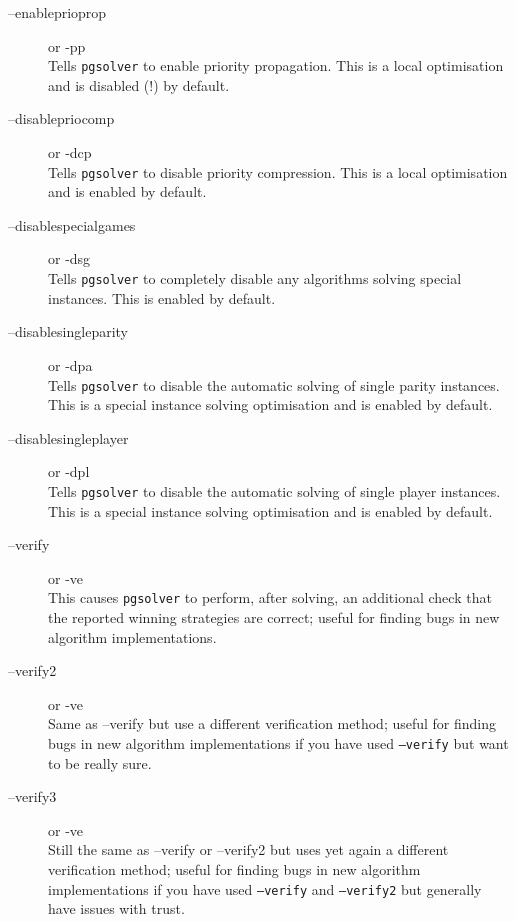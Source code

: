 \begin{description}
\item[{\ttfamily --enableprioprop}]  \enspace or {\ttfamily -pp} \\
   Tells \texttt{pgsolver} to enable priority propagation. This is a local optimisation and is disabled (!) by default.

\item[{\ttfamily --disablepriocomp}]  \enspace or {\ttfamily -dcp} \\
   Tells \texttt{pgsolver} to disable priority compression. This is a local optimisation and is enabled by default.

\item[{\ttfamily --disablespecialgames}]  \enspace or {\ttfamily -dsg} \\
   Tells \texttt{pgsolver} to completely disable any algorithms solving special instances. This is enabled by default.

\item[{\ttfamily --disablesingleparity}]  \enspace or {\ttfamily -dpa} \\
   Tells \texttt{pgsolver} to disable the automatic solving of single parity instances. This is a special instance solving optimisation and is enabled by default.

\item[{\ttfamily --disablesingleplayer}]  \enspace or {\ttfamily -dpl} \\
   Tells \texttt{pgsolver} to disable the automatic solving of single player instances. This is a special instance solving optimisation and is enabled by default.

\item[{\ttfamily --verify}]  \enspace or {\ttfamily -ve} \\
   This causes \texttt{pgsolver} to perform, after solving, an additional check that the reported winning
   strategies are correct; useful for finding bugs in new algorithm implementations.

\item[{\ttfamily --verify2}]  \enspace or {\ttfamily -ve} \\
   Same as {\ttfamily --verify} but use a different verification method; useful for finding bugs in new
   algorithm implementations if you have used \texttt{--verify} but want to be really sure.

\item[{\ttfamily --verify3}]  \enspace or {\ttfamily -ve} \\
   Still the same as {\ttfamily --verify} or {\ttfamily --verify2} but uses yet again a different verification method;
   useful for finding bugs in new algorithm implementations if you have used \texttt{--verify} and
   \texttt{--verify2} but generally have issues with trust.


\end{description}

